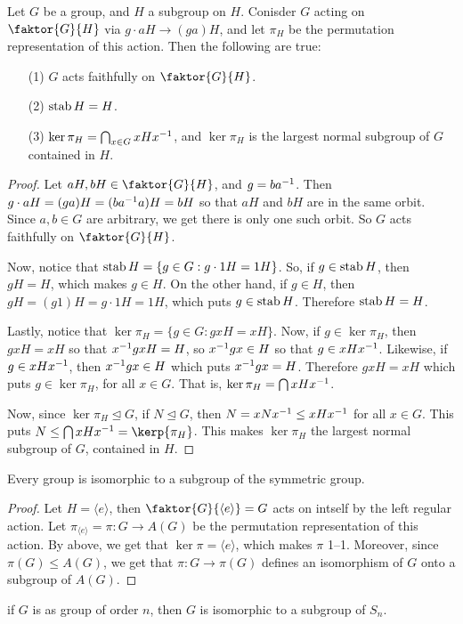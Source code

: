 \begin{theorem}\label{theorem_4.2.1}
  Let $G$ be a group, and  $H$ a subgroup on $H$. Conisder $G$ acting on
  $\faktor{G}{H}$ via $g \cdot aH \xrightarrow{} (ga)H$, and let $\pi_H$ be
  the permutation representation of this action. Then the following are true:
  \begin{enumerate}
    \item[(1)] $G$ acts faithfully on  $\faktor{G}{H}$.

    \item[(2)] $\operatorname{stab}{H}=H$.

    \item[(3)] $\ker{\pi_H}=\bigcap_{x \in G}{xHx^{-1}}$, and $\ker{\pi_H}$
      is the largest normal subgroup of $G$ contained in $H$.
  \end{enumerate}
\end{theorem}
\begin{proof}
  Let $aH,bH \in \faktor{G}{H}$, and $g=ba^{-1}$. Then $g \cdot
  aH=(ga)H=(ba^{-1}a)H=bH$ so that $aH$ and  $bH$ are in the same orbit.
  Since  $a,b \in G$ are arbitrary, we get there is only one such orbit. So
  $G$ acts faithfully on  $\faktor{G}{H}$.

  Now, notice that $\operatorname{stab}{H}=\{g \in G : g \cdot 1H=1H\}$. So, if $g \in
  \operatorname{stab}{H}$, then $gH=H$, which makes  $g \in H$. On the other hand, if  $g
  \in H$, then  $gH=(g1)H=g \cdot 1H=1H$, which puts $g \in \operatorname{stab}{H}$.
  Therefore $\operatorname{stab}{H}=H$.

  Lastly, notice that $\ker{\pi_H}=\{g \in G : gxH=xH\}$. Now, if $g \in
  \ker{\pi_H}$, then $gxH=xH$ so that  $x^{-1}gxH=H$, so $x^{-1}gx \in H$ so
  that $g \in xHx^{-1}$. Likewise, if $g \in xHx^{-1}$, then $x^{-1}gx \in
  H$ which puts $x^{-1}gx=H$. Therefore $gxH=xH$ which puts $g \in
  \ker{\pi_H}$, for all $x \in G$. That is, $\ker{\pi_H}=\bigcap{xHx^{-1}}$.

  Now, since $\ker{\pi_H} \unlhd G$, if $N \unlhd G$, then  $N=xNx^{-1} \leq
  xHx^{-1}$ for all $x \in G$. This puts $N \leq
  \bigcap{xH\inv{x}}=\kerp{\pi_H}$. This makes $\ker{\pi_H}$ the largest
  normal subgroup of $G$, contained in  $H$.
\end{proof}
\begin{corollary}
  Every group is isomorphic to a subgroup of the symmetric group.
\end{corollary}
\begin{proof}
  Let $H=\langle e \rangle$, then $\faktor{G}{\langle e \rangle}=G$ acts on
  intself by the left regular action. Let $\pi_{\langle e \rangle}=\pi:G
  \xrightarrow{} A(G)$ be the permutation representation of this action. By
  above, we get that $\ker{\pi}=\langle e \rangle$, which makes $\pi$ 1--1.
  Moreover, since $\pi(G) \leq A(G)$, we get that $\pi:G \xrightarrow{}
  \pi(G)$ defines an isomorphism of $G$ onto a subgroup of $A(G)$.
\end{proof}
\begin{corollary}
  if $G$ is as group of order $n$, then $G$ is isomorphic to a subgroup of
  $S_n$.
\end{corollary}

